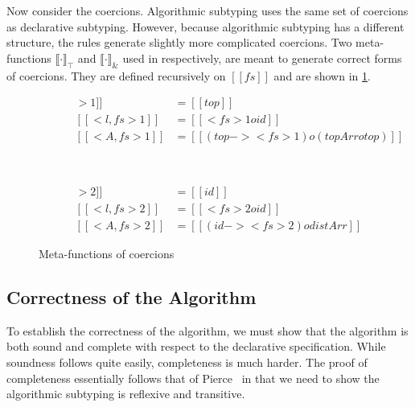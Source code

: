 Now consider the coercions. Algorithmic subtyping uses the same set of
coercions as declarative subtyping. However, because algorithmic
subtyping has a different structure, the rules generate slightly more
complicated coercions. Two meta-functions $\llbracket \cdot \rrbracket_{\top}$
and $\llbracket \cdot \rrbracket_{\&}$ used in  respectively,
are meant to generate correct forms of coercions. They are defined recursively
on $[[fs]]$ and are shown in \cref{fig:coercion}.

\begin{figure}[t]
    \centering
    \begin{small}
    \begin{subfigure}[b]{0.5\textwidth}
      \begin{align*}
        [[ < [] >1 ]] &=  [[top]] \\
        [[ < { l } , fs >1 ]] &= [[ < fs >1 o id  ]] \\
        [[ < A , fs >1 ]] &= [[(top -> < fs >1) o (topArr o top)]]
      \end{align*}
    \end{subfigure} ~
    \begin{subfigure}[b]{0.45\textwidth}
      \begin{align*}
        [[ < [] >2 ]] &=  [[id]] \\
        [[ < { l } , fs >2 ]] &= [[ < fs >2 o id  ]] \\
        [[ < A , fs >2 ]] &= [[(id -> < fs >2) o distArr]]
      \end{align*}
    \end{subfigure}
    \end{small}
    \caption{Meta-functions of coercions}\label{fig:coercion}
\end{figure}

\subsection{Correctness of the Algorithm}

To establish the correctness of the algorithm, we must show that the algorithm
is both sound and complete with respect to the declarative specification. While
soundness follows quite easily, completeness is much harder. The proof of
completeness essentially follows that of Pierce~\cite{pierce1989decision}
in that we
need to show the algorithmic subtyping is reflexive and
transitive. 



